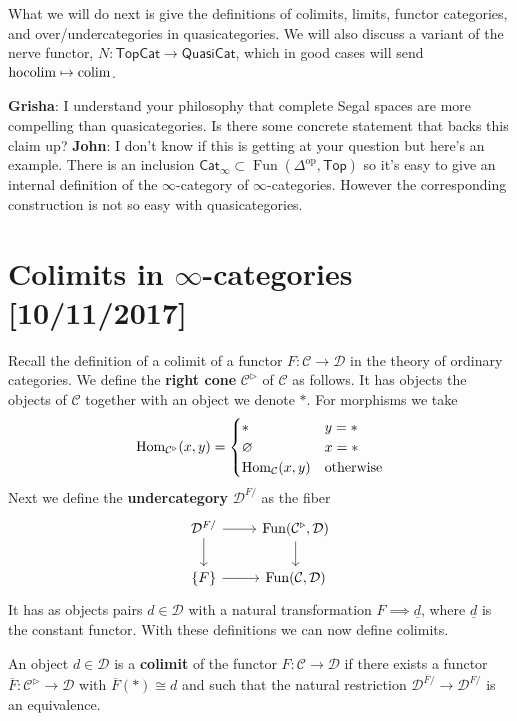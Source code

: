 \documentclass{amsart}
\DeclareMathOperator{\Fun}{Fun}
\DeclareMathOperator{\hocolim}{hocolim}
\begin{document}
What we will do next is give the definitions of colimits, limits, functor categories,
and over/undercategories in quasicategories. We will also discuss a variant of
the nerve functor, $N:\mathsf{TopCat}\to\mathsf{QuasiCat}$, which in good cases will
send $\hocolim\mapsto\colim$.

\textbf{Grisha}: I understand your philosophy that complete Segal spaces are
more compelling than quasicategories. Is there some concrete statement that backs
this claim up?
\textbf{John}: I don't know if this is getting at your question but here's an example.
There is an inclusion $\mathsf{Cat}_\infty\subset\Fun(\Delta^\text{op},\mathsf{Top})$
so it's easy to give an internal definition of the $\infty$-category of $\infty$-categories.
However the corresponding construction is not so easy with quasicategories.

\newpage


\section{Colimits in $\infty$-categories [10/11/2017]}

Recall the definition of a colimit of a functor $F:\mathcal{C}\to \mathcal{D}$ in the theory of ordinary categories.
We define the \textbf{right cone} $\mathcal{C}^\triangleright$ of $\mathcal{C}$ as follows.
It has objects the objects of $\mathcal{C}$ together with an object we denote $*$. For morphisms
we take
\begin{equation*}
    \operatorname{Hom}_{\mathcal{C}^\triangleright}(x,y) = 
    \begin{cases}
        * & y=* \\
        \varnothing & x=* \\
        \operatorname{Hom}_\mathcal{C}(x,y) & \text{otherwise}
    \end{cases}
\end{equation*}
Next we define the \textbf{undercategory} $\mathcal{D}^{F/}$ as the fiber
\begin{equation*}
    \begin{tikzcd}
        \mathcal{D}^{F/} \dar\rar & \Fun(\mathcal{C}^\triangleright, \mathcal{D})\dar \\
        \{F\} \rar & \Fun(\mathcal{C},\mathcal{D})
    \end{tikzcd}
\end{equation*}
It has as objects pairs $d\in\mathcal{D}$ with a natural transformation
$F\implies \underline{d}$, where $\underline{d}$ is the constant functor.
With these definitions we can now define colimits.
\begin{definition}
    An object $d\in\mathcal{D}$ is a \textbf{colimit} of the functor $F:\mathcal{C}\to \mathcal{D}$
    if there exists a functor $\overline F:\mathcal{C}^\triangleright\to \mathcal{D}$ 
    with $\overline F(*)\cong d$ and such that the natural restriction
    $\mathcal{D}^{\overline F/} \to \mathcal{D}^{F/}$ is an equivalence.
\end{definition}
\end{document}
